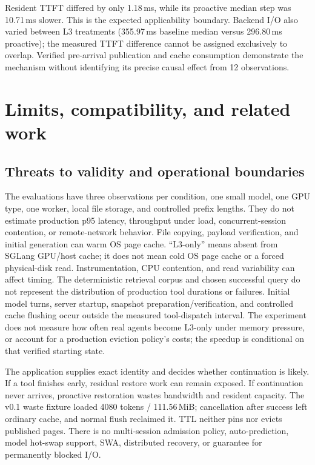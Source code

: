 \documentclass[10pt,a4paper]{article}
\newcommand{\pagemark}{\newpage}
\begin{document}
Resident TTFT differed by only 1.18\,ms, while its proactive median step was 10.71\,ms slower. This is the expected applicability boundary. Backend I/O also varied between L3 treatments (355.97\,ms baseline median versus 296.80\,ms proactive); the measured TTFT difference cannot be assigned exclusively to overlap. Verified pre-arrival publication and cache consumption demonstrate the mechanism without identifying its precise causal effect from 12 observations.

\pagemark
\section{Limits, compatibility, and related work}
\subsection{Threats to validity and operational boundaries}
The evaluations have three observations per condition, one small model, one GPU type, one worker, local file storage, and controlled prefix lengths. They do not estimate production p95 latency, throughput under load, concurrent-session contention, or remote-network behavior. File copying, payload verification, and initial generation can warm OS page cache. ``L3-only'' means absent from SGLang GPU/host cache; it does not mean cold OS page cache or a forced physical-disk read. Instrumentation, CPU contention, and read variability can affect timing. The deterministic retrieval corpus and chosen successful query do not represent the distribution of production tool durations or failures. Initial model turns, server startup, snapshot preparation/verification, and controlled cache flushing occur outside the measured tool-dispatch interval. The experiment does not measure how often real agents become L3-only under memory pressure, or account for a production eviction policy's costs; the speedup is conditional on that verified starting state.

The application supplies exact identity and decides whether continuation is likely. If a tool finishes early, residual restore work can remain exposed. If continuation never arrives, proactive restoration wastes bandwidth and resident capacity. The v0.1 waste fixture loaded 4080 tokens / 111.56\,MiB; cancellation after success left ordinary cache, and normal flush reclaimed it. TTL neither pins nor evicts published pages. There is no multi-session admission policy, auto-prediction, model hot-swap support, SWA, distributed recovery, or guarantee for permanently blocked I/O.
\end{document}
